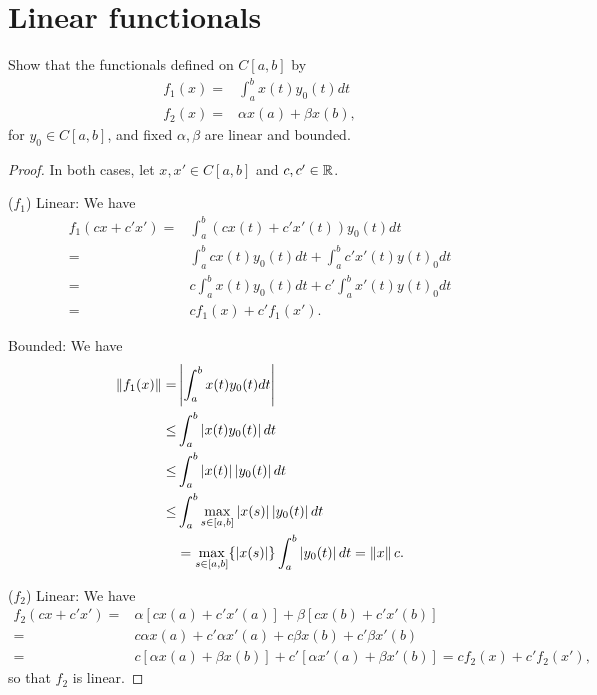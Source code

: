 \section{Linear functionals}


\begin{exercise}{2}
Show that the functionals defined on $C[a,b]$ by 
\begin{align*}
    f_1(x) =& \int_a^b x(t)y_0(t)dt\\
    f_2(x) =& \alpha x(a) +\beta x(b),
\end{align*}
for $y_0\in C[a,b]$, and fixed $\alpha,\beta$ are linear and bounded.
\end{exercise}
\begin{proof}
In both cases, let $x,x'\in C[a,b]$ and $c,c'\in \mathbb{R}$.

($f_1$) 
Linear: 
We have 
\begin{align*}
    f_1(cx+c'x') 
    =& \int_a^b(cx(t)+c'x'(t))y_0(t) dt\\
    =& \int_a^b cx(t)y_0(t)dt + \int_a^b c'x'(t)y(t)_0dt\\
    =& c\int_a^b x(t)y_0(t)dt + c'\int_a^b x'(t)y(t)_0dt\\
    =& cf_1(x)+c'f_1(x').
\end{align*}

Bounded: 
We have
\begin{align*}
    \left\lVert f_1(x)\right\rVert
    =& \left\lvert \int_a^b x(t)y_0(t)dt\right\rvert\\
    \leq& \int_a^b \left\lvert x(t)y_0(t)\right\rvert dt\\
    \leq& \int_a^b \left\lvert x(t)\right\rvert\left\lvert y_0(t)\right\rvert dt\\
    \leq& \int_a^b \max_{s\in[a,b]}\left\lvert x(s)\right\rvert\left\lvert y_0(t)\right\rvert dt\\
    &= \max_{s\in[a,b]}\{\left\lvert x(s)\right\rvert\} \int_a^b\left\lvert y_0(t)\right\rvert dt =\left\lVert x\right\rVert c.
\end{align*}

($f_2$)
Linear:
We have
\begin{align*}
    f_2(cx +c'x')
    =& \alpha [cx(a)+c'x'(a)] +\beta [cx(b)+c'x'(b)]\\
    =& c\alpha x(a)+ c'\alpha x'(a) 
    +c\beta x(b) + c'\beta x'(b)\\
    =& c[\alpha x(a) +\beta x(b)]
    + c'[\alpha x'(a) +\beta x'(b)] = cf_2(x)+c'f_2(x'),
\end{align*}
so that $f_2$ is linear.


\end{proof}
